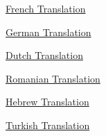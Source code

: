               
                \href{http://submoon.freeshell.org/fr/valium/say.html}{French Translation}


              
            
            
              
            
            
              
                
              
              
              
                \href{http://www.magplot.de/WhatYouCantSay.php}{German Translation}


              
              
              
                
              
              
              
                \href{http://www.meervrijheid.nl/pg-say.htm}{Dutch Translation}


              
            
            
              
            
            
              
                
              
              
              
                \href{http://ro.goobix.com/pg/say/}{Romanian Translation}


              
              
              
                
              
              
              
                \href{http://smallestbusiness.com/heb/blog/what-you-cant-say-hebrew/}{Hebrew Translation}


              
            
            
              
            
            
              
                
              
              
              
                \href{http://tayfunsen.blogspot.com/2007/08/syleyemedikleriniz.html}{Turkish Translation}


              
              
